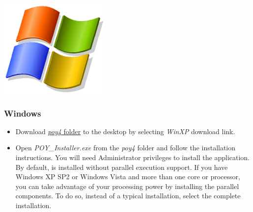 \begin{flushleft}
	\begin{minipage}[c]{0.074\textwidth}
	   	\includegraphics[width=\textwidth]{figures/figlogowindows.jpg}
	\end{minipage}
	\quad
	\begin{minipage}[t]{0.88\textwidth}
		   	\subsubsection{Windows}
	\end{minipage}
		\begin{itemize}
			\item
                Download
                \href{http://research.amnh.org/scicomp/projects/poy.php}{\emph{poy4} folder} to the desktop by selecting \emph{WinXP} download link.

			\item 
                Open \emph{POY\_Installer.exe} from the \emph{poy4} folder and follow the installation instructions. You will need Administrator privileges to install the application. 
                By default, \poy is installed without parallel execution support. If you have Windows XP SP2 or Windows Vista and more than one core or processor, you can take advantage of your processing power by installing the parallel components. To do so, instead of a typical installation, select the complete installation. 
                

\end{itemize}
\end{flushleft}
